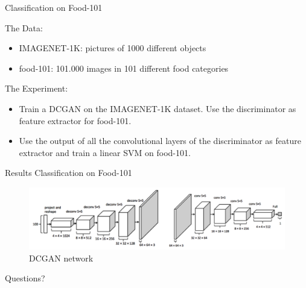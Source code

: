 \documentclass[10pt]{beamer}
\begin{document}
{
\begin{frame}{Classification on Food-101}
      \begin{block}{The Data:}
	\begin{itemize}
    \item IMAGENET-1K: pictures of 1000 different objects
    \item food-101: 101.000 images in 101 different food categories
  \end{itemize}
    \end{block}
        \begin{block}{The Experiment:}
	\begin{itemize}
	\item Train a DCGAN on the IMAGENET-1K dataset. Use the discriminator as feature extractor for food-101. 
	\item Use the output of all the convolutional layers of the discriminator as feature extractor and train a linear SVM on food-101.
  \end{itemize}
    \end{block}
\end{frame}
}

{
\begin{frame}{Results Classification on Food-101}
\begin{figure}[htbp] 
  \centering
     \includegraphics[width=1.0\textwidth]{pic/structure_dcgan.png}
  \caption{DCGAN network}
  \label{fig:Bild1}
\end{figure}
\end{frame}
}

\begin{frame}[standout]
  Questions?
\end{frame}
\end{document}
